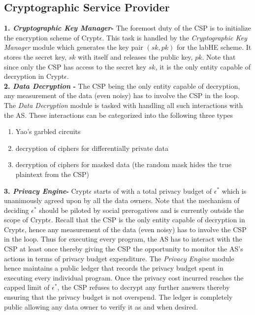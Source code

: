 \subsection*{Cryptographic Service Provider}
\textbf{1. \textit{ Cryptographic Key Manager}-} The foremost duty of the \textsf{CSP} is to initialize the encryption scheme of Crypt$\epsilon$. This task is handled by the \textit{Cryptographic Key Manager} module which generates the key pair $(sk,pk)$ for the \textsf{labHE} scheme. It stores the secret key, $sk$ with itself and releases the public key, $pk$. Note that since only the \textsf{CSP} has access to the secret key $sk$, it is the only entity capable of decryption in Crypt$\epsilon$.\\\textbf{2. \textit{ Data Decryption} - } The \textsf{CSP} being the only entity capable of decryption,  any measurement of the data (even noisy) has to involve the \textsf{CSP} in the loop. The \textit{Data Decryption} module is tasked with handling all such interactions with the \textsf{AS}. These interactions can be categorized into the following three types  \begin{enumerate}\item Yao's garbled circuits \item decryption of ciphers for differentially private data \item decryption of ciphers for masked data (the random mask hides the true plaintext from the \textsf{CSP}) \end{enumerate}
\textbf{3. \textit{ Privacy Engine}-} Crypt$\epsilon$ starts of with a total privacy budget of $\epsilon^*$ which is unanimously agreed upon by all the data owners. Note that the mechanism of deciding $\epsilon^*$ should be piloted by social prerogatives and is currently outside the scope of Crypt$\epsilon$. Recall that the CSP is the only entity capable of decryption in Crypt$\epsilon$, hence any measurement of the data (even noisy) has to involve the \textsf{CSP} in the loop.  Thus for executing every program, the \textsf{AS} has to interact with the \textsf{CSP} at least once thereby giving the \textsf{CSP} the opportunity to monitor the \textsf{AS}'s actions in terms of privacy budget expenditure. The \textit{Privacy Engine} module hence maintains a public ledger that records the privacy budget spent in executing every individual program. Once the privacy cost incurred reaches the capped limit of $\epsilon^*$, the \textsf{CSP} refuses to decrypt any further answers thereby ensuring that the privacy budget is not overspend.  The ledger is completely public allowing any data owner to verify it as and when desired.

